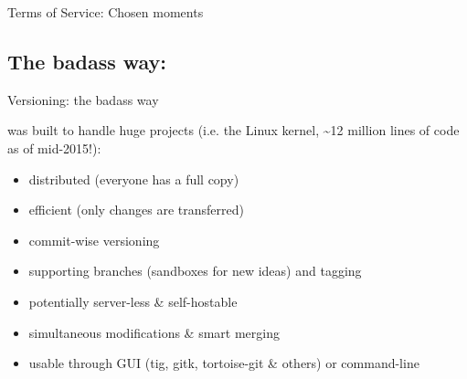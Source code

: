 \documentclass[10pt]{beamer}
\def\giticon{{\FA\symbol{"F1D3}} }
\begin{document}
\begin{frame}{Terms of Service: Chosen moments}
\end{frame}

\subsection{The badass way: \giticon} %

\begin{frame}{Versioning: the badass way} %

  \giticon was built to handle huge projects (i.e. the Linux kernel, \textasciitilde 12 million lines of code as of mid-2015!):

  \begin{itemize}
  \item distributed (everyone has a full copy)
  \item efficient (only changes are transferred)
  \item commit-wise versioning
  \item supporting branches (sandboxes for new ideas) and tagging
  \item potentially server-less \& self-hostable
  \item simultaneous modifications \& smart merging
  \item usable through GUI (tig, gitk, tortoise-git \& others) or command-line
  \end{itemize}

\end{frame}
\end{document}

